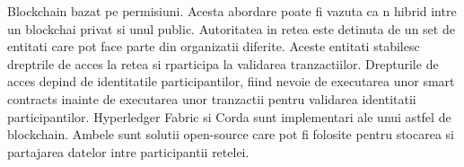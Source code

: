 \documentclass[12pt,a4paper,twoside]{report}
\begin{document}
	Blockchain bazat pe permisiuni. Acesta abordare poate fi vazuta ca n hibrid intre un blockchai privat si unul public. Autoritatea in retea este detinuta de un set de entitati care pot face parte din organizatii diferite. Aceste entitati stabilesc dreptrile de acces la retea si rparticipa la validarea tranzactiilor. Drepturile de acces depind de identitatile participantilor, fiind nevoie de executarea unor smart contracts inainte de executarea unor tranzactii pentru validarea identitatii participantilor. Hyperledger Fabric si Corda sunt implementari ale unui astfel de blockchain. Ambele sunt solutii open-source care pot fi folosite pentru stocarea si partajarea datelor intre participantii retelei.
\begin{table}[]
\caption{Comparatie la nivel inalt a implementarilor tehnologiei blockchain}
\label{table2}
\end{table}
\end{document}
